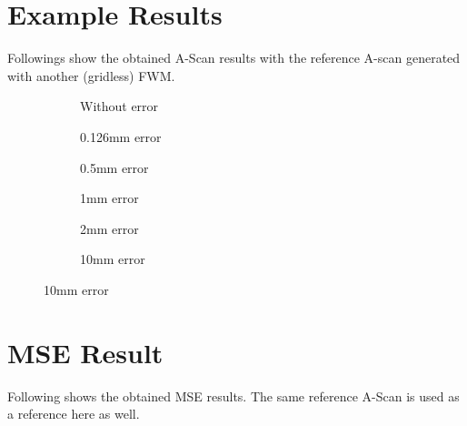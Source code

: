 \documentclass{article}
\begin{document}
\section{Example Results}
Followings show the obtained A-Scan results with the reference A-scan generated with another (gridless) FWM.

\begin{figure}
\begin{center}
\begin{subfigure}[T]{0.4\textwidth}
\caption{Without error}
\end{subfigure}
\hfill
\begin{subfigure}[T]{0.4\textwidth}
\caption{0.126mm  error}
\end{subfigure}
\hfill
\begin{subfigure}[T]{0.4\textwidth}
\caption{0.5mm  error}
\end{subfigure}
\hfill
\begin{subfigure}[T]{0.4\textwidth}
\caption{1mm  error}
\end{subfigure}
\hfill
\begin{subfigure}[T]{0.4\textwidth}
\caption{2mm  error}
\end{subfigure}
\hfill
\begin{subfigure}[T]{0.4\textwidth}
\caption{10mm  error}
\end{subfigure}
\hfill
\end{center}
\end{figure}


\section{MSE Result}
Following shows the obtained MSE results. The same reference A-Scan is used as a reference here as well.

\begin{figure}[h!]
\begin{center}
\end{center}
\end{figure}
\end{document}
